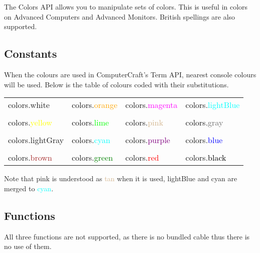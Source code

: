 The Colors API allows you to manipulate sets of colors. This is useful in colors on Advanced Computers and Advanced Monitors. British spellings are also supported.

\subsection{Constants}

When the colours are used in ComputerCraft's Term API, nearest console colours will be used. Below is the table of colours coded with their substitutions.

\begin{tabularx}{\textwidth}{l l l l}
	colors.white & colors.\textcolor{orange}{orange} & colors.\textcolor{magenta}{magenta} & colors.\textcolor{cyan}{lightBlue}
	\\ \\
	colors.\textcolor{yellow}{yellow} & colors.\textcolor{lime}{lime} & colors.\textcolor{tan}{pink} & colors.\textcolor{dimgrey}{gray}
	\\ \\
	colors.\textcolor{brightgrey}{lightGray} & colors.\textcolor{cyan}{cyan} & colors.\textcolor{purple}{purple} & colors.\textcolor{blue}{blue}
	\\ \\
	colors.\textcolor{brown}{brown} & colors.\textcolor{green}{green} & colors.\textcolor{red}{red} & colors.\textcolor{black}{black}
\end{tabularx}

Note that pink is understood as \textcolor{tan}{tan} when it is used, lightBlue and cyan are merged to \textcolor{cyan}{cyan}.

\subsection{Functions}

All three functions are not supported, as there is no bundled cable thus there is no use of them.